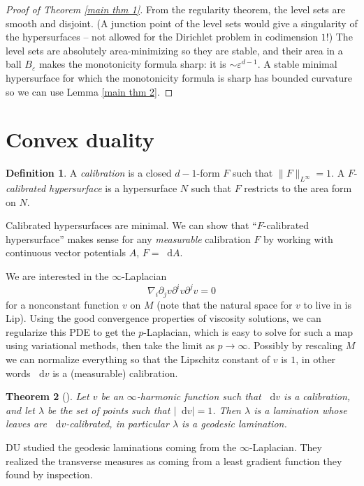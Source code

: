 \documentclass[reqno,11pt]{amsart}
\newcommand*\dif{\mathop{}\!\mathrm{d}}
\newcommand{\dfn}[1]{\emph{#1}\index{#1}}
\newtheorem{theorem}{Theorem}[section]
\theoremstyle{definition}
\newtheorem{definition}[theorem]{Definition}
\numberwithin{equation}{section}
\begin{document}
\begin{proof}[Proof of Theorem \ref{main thm 1}]
From the regularity theorem, the level sets are smooth and disjoint.
(A junction point of the level sets would give a singularity of the hypersurfaces -- not allowed for the Dirichlet problem in codimension $1$!)
The level sets are absolutely area-minimizing so they are stable, and their area in a ball $B_\varepsilon$ makes the monotonicity formula sharp: it is $\sim \varepsilon^{d - 1}$.
A stable minimal hypersurface for which the monotonicity formula is sharp has bounded curvature \cite{Schoen81} so we can use Lemma \ref{main thm 2}.
\end{proof}

\section{Convex duality}
\begin{definition}
A \dfn{calibration} is a closed $d - 1$-form $F$ such that $\|F\|_{L^\infty} = 1$.
A $F$-\dfn{calibrated hypersurface} is a hypersurface $N$ such that $F$ restricts to the area form on $N$.
\end{definition}

Calibrated hypersurfaces are minimal.
We can show that ``$F$-calibrated hypersurface'' makes sense for any \emph{measurable} calibration $F$ by working with continuous vector potentials $A$, $F = \dif A$.

We are interested in the $\infty$-Laplacian
$$\nabla_i \partial_j v \partial^i v \partial^j v = 0$$
for a nonconstant function $v$ on $M$ (note that the natural space for $v$ to live in is Lip).
Using the good convergence properties of viscosity solutions, we can regularize this PDE to get the $p$-Laplacian, which is easy to solve for such a map using variational methods, then take the limit as $p \to \infty$.
Possibly by rescaling $M$ we can normalize everything so that the Lipschitz constant of $v$ is $1$, in other words $\dif v$ is a (measurable) calibration.

\begin{theorem}[{\cite{daskalopoulos2020transverse}}]
Let $v$ be an $\infty$-harmonic function such that $\dif v$ is a calibration, and let $\lambda$ be the set of points such that $|\dif v| = 1$.
Then $\lambda$ is a lamination whose leaves are $\dif v$-calibrated, in particular $\lambda$ is a geodesic lamination.
\end{theorem}

DU studied the geodesic laminations coming from the $\infty$-Laplacian.
They realized the transverse measures as coming from a least gradient function they found by inspection.
\end{document}
